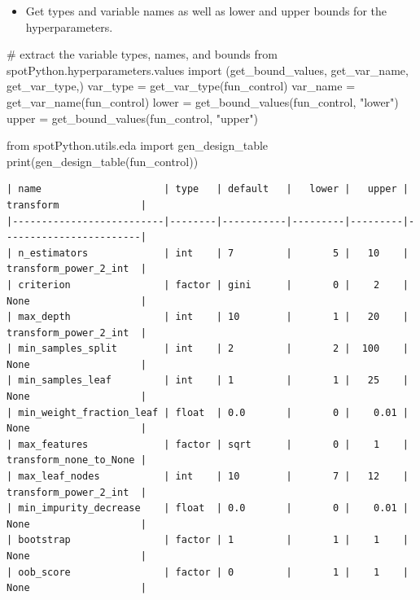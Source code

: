 \documentclass[
  letterpaper,
  DIV=11,
  numbers=noendperiod]{scrreprt}
\newenvironment{Shaded}{\begin{snugshade}}{\end{snugshade}}
\newcommand{\BuiltInTok}[1]{\textcolor[rgb]{0.00,0.23,0.31}{#1}}
\newcommand{\CommentTok}[1]{\textcolor[rgb]{0.37,0.37,0.37}{#1}}
\newcommand{\ImportTok}[1]{\textcolor[rgb]{0.00,0.46,0.62}{#1}}
\newcommand{\NormalTok}[1]{\textcolor[rgb]{0.00,0.23,0.31}{#1}}
\newcommand{\OperatorTok}[1]{\textcolor[rgb]{0.37,0.37,0.37}{#1}}
\newcommand{\StringTok}[1]{\textcolor[rgb]{0.13,0.47,0.30}{#1}}
\providecommand{\tightlist}{%
  \setlength{\itemsep}{0pt}\setlength{\parskip}{0pt}}\usepackage{longtable,booktabs,array}
\begin{document}
\begin{itemize}
\tightlist
\item
  Get types and variable names as well as lower and upper bounds for the
  hyperparameters.
\end{itemize}

\begin{Shaded}
\begin{Highlighting}[]
\CommentTok{\# extract the variable types, names, and bounds}
\ImportTok{from}\NormalTok{ spotPython.hyperparameters.values }\ImportTok{import}\NormalTok{ (get\_bound\_values,}
\NormalTok{    get\_var\_name,}
\NormalTok{    get\_var\_type,)}
\NormalTok{var\_type }\OperatorTok{=}\NormalTok{ get\_var\_type(fun\_control)}
\NormalTok{var\_name }\OperatorTok{=}\NormalTok{ get\_var\_name(fun\_control)}
\NormalTok{lower }\OperatorTok{=}\NormalTok{ get\_bound\_values(fun\_control, }\StringTok{"lower"}\NormalTok{)}
\NormalTok{upper }\OperatorTok{=}\NormalTok{ get\_bound\_values(fun\_control, }\StringTok{"upper"}\NormalTok{)}
\end{Highlighting}
\end{Shaded}

\begin{Shaded}
\begin{Highlighting}[]
\ImportTok{from}\NormalTok{ spotPython.utils.eda }\ImportTok{import}\NormalTok{ gen\_design\_table}
\BuiltInTok{print}\NormalTok{(gen\_design\_table(fun\_control))}
\end{Highlighting}
\end{Shaded}

\begin{verbatim}
| name                     | type   | default   |   lower |   upper | transform              |
|--------------------------|--------|-----------|---------|---------|------------------------|
| n_estimators             | int    | 7         |       5 |   10    | transform_power_2_int  |
| criterion                | factor | gini      |       0 |    2    | None                   |
| max_depth                | int    | 10        |       1 |   20    | transform_power_2_int  |
| min_samples_split        | int    | 2         |       2 |  100    | None                   |
| min_samples_leaf         | int    | 1         |       1 |   25    | None                   |
| min_weight_fraction_leaf | float  | 0.0       |       0 |    0.01 | None                   |
| max_features             | factor | sqrt      |       0 |    1    | transform_none_to_None |
| max_leaf_nodes           | int    | 10        |       7 |   12    | transform_power_2_int  |
| min_impurity_decrease    | float  | 0.0       |       0 |    0.01 | None                   |
| bootstrap                | factor | 1         |       1 |    1    | None                   |
| oob_score                | factor | 0         |       1 |    1    | None                   |
\end{verbatim}
\end{document}

